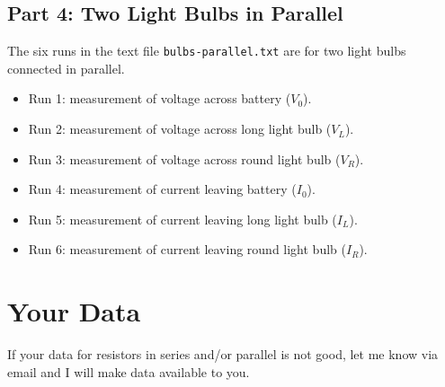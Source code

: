 \subsection{Part 4: Two Light Bulbs in Parallel}
%
The six runs in the text file \texttt{bulbs-parallel.txt} are for two light bulbs connected in parallel.
\begin{itemize}
	\item Run 1: measurement of voltage across battery ($V_{0}$).
	\item Run 2: measurement of voltage across long light bulb ($V_{L}$).
	\item Run 3: measurement of voltage across round light bulb ($V_{R}$).
	\item Run 4: measurement of current leaving battery ($I_{0}$).
	\item Run 5: measurement of current leaving long light bulb ($I_{L}$).
	\item Run 6: measurement of current leaving round light bulb ($I_{R}$).
\end{itemize}
%
\section{Your Data}
%
If your data for resistors in series and/or parallel is not good, let me know via email and I will make data available to you.
%
\newpage
